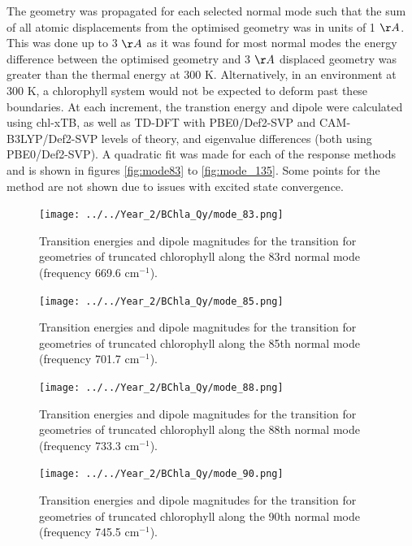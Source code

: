 The geometry was propagated for each selected normal mode such that the sum of
all atomic displacements from the optimised geometry was in units of 1 $\AA{}$.
This was done up to 3 $\AA{}$ as it was found for most normal modes the energy 
difference between the optimised geometry and 3 $\AA{}$ displaced geometry was greater
than the thermal energy at 300 K. Alternatively, in an environment at 300 K, a chlorophyll 
system would not be expected to deform past these boundaries. At each increment,
the \Qy transtion energy and dipole were calculated using chl-xTB, as well as TD-DFT
with PBE0/Def2-SVP and CAM-B3LYP/Def2-SVP levels of theory, \dscf and eigenvalue 
differences (both using PBE0/Def2-SVP). A quadratic fit was made for each of the
response methods and is shown in figures \ref{fig:mode83} to \ref{fig:mode_135}. 
Some points for the \dscf method are not shown due to issues with excited state 
convergence.

\begin{figure}
    \centering
    \texttt{[image: ../../Year\_2/BChla\_Qy/mode\_83.png]}
    \caption{Transition energies and dipole magnitudes for the \Qy transition for
    geometries of truncated chlorophyll along the 83rd normal mode (frequency 669.6
    $\text{cm}^{-1}$).}
    \label{fig:mode_83}
\end{figure}

\begin{figure}
    \centering
    \texttt{[image: ../../Year\_2/BChla\_Qy/mode\_85.png]}
    \caption{Transition energies and dipole magnitudes for the \Qy transition for
    geometries of truncated chlorophyll along the 85th normal mode (frequency 701.7
    $\text{cm}^{-1}$).}
    \label{fig:mode_85}
\end{figure}

\begin{figure}
    \centering
    \texttt{[image: ../../Year\_2/BChla\_Qy/mode\_88.png]}
    \caption{Transition energies and dipole magnitudes for the \Qy transition for
    geometries of truncated chlorophyll along the 88th normal mode (frequency 733.3
    $\text{cm}^{-1}$).}
    \label{fig:mode_88}
\end{figure}

\begin{figure}
    \centering
    \texttt{[image: ../../Year\_2/BChla\_Qy/mode\_90.png]}
    \caption{Transition energies and dipole magnitudes for the \Qy transition for
    geometries of truncated chlorophyll along the 90th normal mode (frequency 745.5
    $\text{cm}^{-1}$).}
    \label{fig:mode_90}
\end{figure}

